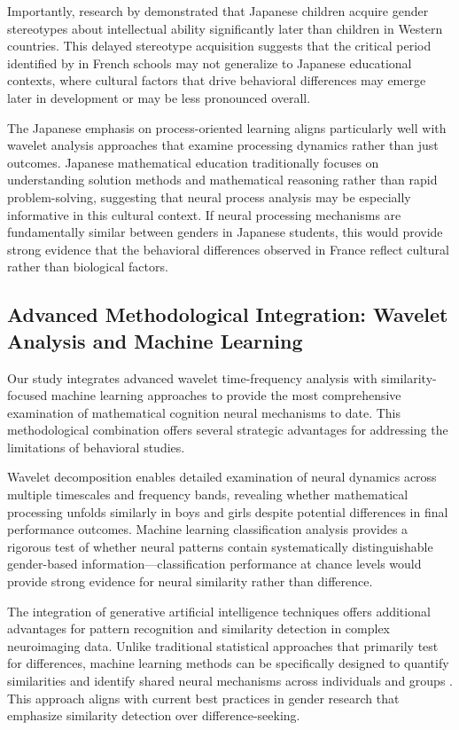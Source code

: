 \documentclass[pdflatex,sn-nature]{sn-jnl}%
\theoremstyle{thmstyleone}%
\theoremstyle{thmstyletwo}%
\theoremstyle{thmstylethree}%
\begin{document}
Importantly, research by \cite{tatsuno2022development} demonstrated that Japanese children acquire gender stereotypes about intellectual ability significantly later than children in Western countries. This delayed stereotype acquisition suggests that the critical period identified by \cite{martinot2025mathematical} in French schools may not generalize to Japanese educational contexts, where cultural factors that drive behavioral differences may emerge later in development or may be less pronounced overall.

The Japanese emphasis on process-oriented learning aligns particularly well with wavelet analysis approaches that examine processing dynamics rather than just outcomes. Japanese mathematical education traditionally focuses on understanding solution methods and mathematical reasoning rather than rapid problem-solving, suggesting that neural process analysis may be especially informative in this cultural context. If neural processing mechanisms are fundamentally similar between genders in Japanese students, this would provide strong evidence that the behavioral differences observed in France reflect cultural rather than biological factors.


\subsection{Advanced Methodological Integration: Wavelet Analysis and Machine Learning}
Our study integrates advanced wavelet time-frequency analysis with similarity-focused machine learning approaches to provide the most comprehensive examination of mathematical cognition neural mechanisms to date. This methodological combination offers several strategic advantages for addressing the limitations of behavioral studies.

Wavelet decomposition enables detailed examination of neural dynamics across multiple timescales and frequency bands, revealing whether mathematical processing unfolds similarly in boys and girls despite potential differences in final performance outcomes. Machine learning classification analysis provides a rigorous test of whether neural patterns contain systematically distinguishable gender-based information—classification performance at chance levels would provide strong evidence for neural similarity rather than difference.

The integration of generative artificial intelligence techniques offers additional advantages for pattern recognition and similarity detection in complex neuroimaging data. Unlike traditional statistical approaches that primarily test for differences, machine learning methods can be specifically designed to quantify similarities and identify shared neural mechanisms across individuals and groups \cite{poldrack2020establishment}. This approach aligns with current best practices in gender research that emphasize similarity detection over difference-seeking.
\end{document}
